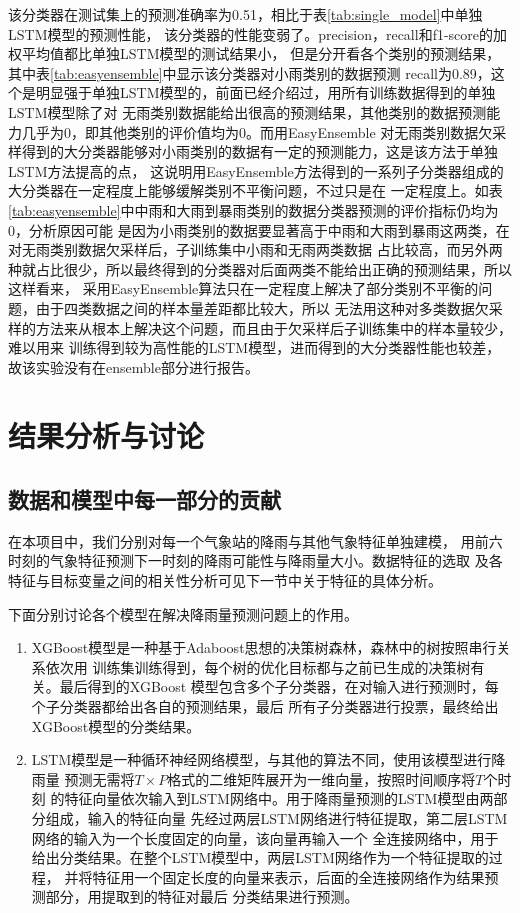 \documentclass[UTF8]{ctexart}
\begin{document}
该分类器在测试集上的预测准确率为0.51，相比于表\ref{tab:single_model}中单独LSTM模型的预测性能，
该分类器的性能变弱了。precision，recall和f1-score的加权平均值都比单独LSTM模型的测试结果小，
但是分开看各个类别的预测结果，其中表\ref{tab:easyensemble}中显示该分类器对小雨类别的数据预测
recall为0.89，这个是明显强于单独LSTM模型的，前面已经介绍过，用所有训练数据得到的单独LSTM模型除了对
无雨类别数据能给出很高的预测结果，其他类别的数据预测能力几乎为0，即其他类别的评价值均为0。而用EasyEnsemble
对无雨类别数据欠采样得到的大分类器能够对小雨类别的数据有一定的预测能力，这是该方法于单独LSTM方法提高的点，
这说明用EasyEnsemble方法得到的一系列子分类器组成的大分类器在一定程度上能够缓解类别不平衡问题，不过只是在
一定程度上。如表\ref{tab:easyensemble}中中雨和大雨到暴雨类别的数据分类器预测的评价指标仍均为0，分析原因可能
是因为小雨类别的数据要显著高于中雨和大雨到暴雨这两类，在对无雨类别数据欠采样后，子训练集中小雨和无雨两类数据
占比较高，而另外两种就占比很少，所以最终得到的分类器对后面两类不能给出正确的预测结果，所以这样看来，
采用EasyEnsemble算法只在一定程度上解决了部分类别不平衡的问题，由于四类数据之间的样本量差距都比较大，所以
无法用这种对多类数据欠采样的方法来从根本上解决这个问题，而且由于欠采样后子训练集中的样本量较少，难以用来
训练得到较为高性能的LSTM模型，进而得到的大分类器性能也较差，故该实验没有在ensemble部分进行报告。




\section{结果分析与讨论}
\subsection{数据和模型中每一部分的贡献}
在本项目中，我们分别对每一个气象站的降雨与其他气象特征单独建模，
用前六时刻的气象特征预测下一时刻的降雨可能性与降雨量大小。数据特征的选取
及各特征与目标变量之间的相关性分析可见下一节中关于特征的具体分析。

下面分别讨论各个模型在解决降雨量预测问题上的作用。
\begin{enumerate}
  \item XGBoost模型是一种基于Adaboost思想的决策树森林，森林中的树按照串行关系依次用
  训练集训练得到，每个树的优化目标都与之前已生成的决策树有关。最后得到的XGBoost
  模型包含多个子分类器，在对输入进行预测时，每个子分类器都给出各自的预测结果，最后
  所有子分类器进行投票，最终给出XGBoost模型的分类结果。
  \item LSTM模型是一种循环神经网络模型，与其他的算法不同，使用该模型进行降雨量
  预测无需将$T\times P$格式的二维矩阵展开为一维向量，按照时间顺序将$T$个时刻
  的特征向量依次输入到LSTM网络中。用于降雨量预测的LSTM模型由两部分组成，输入的特征向量
  先经过两层LSTM网络进行特征提取，第二层LSTM网络的输入为一个长度固定的向量，该向量再输入一个
  全连接网络中，用于给出分类结果。在整个LSTM模型中，两层LSTM网络作为一个特征提取的过程，
  并将特征用一个固定长度的向量来表示，后面的全连接网络作为结果预测部分，用提取到的特征对最后
  分类结果进行预测。
\end{enumerate}
\end{document}
